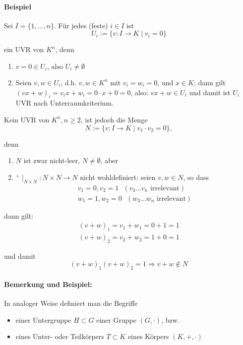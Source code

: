 \paragraph{Beispiel}
	Sei $I=\{1,...,n\}$. Für jedes (feste) $i\in I$ ist
	\begin{equation*}
		U_i := \{v:I\to K\mid v_i =0\}
	\end{equation*}

	ein UVR von $K^n$, denn
	\begin{enumerate}
		\item $v = 0 \in U_i\text{, also } U_i \neq \emptyset$
		\item Seien $v,w\in U_i$, d.h. $v,w\in K^n$ mit $v_i =w_i =0$, und $x\in K$; dann gilt $(vx+w)_i = v_ix+ w_i = 0\cdot x + 0 = 0$, also: $vx+w\in U_i$ und damit ist $U_i$ UVR nach Unterraumkriterium.  
	\end{enumerate}
	
	Kein UVR von $K^n, n\geq 2$, ist jedoch die Menge
	\begin{equation*}
		N:=\{v:I\to K\mid v_1\cdot v_2 = 0\},
	\end{equation*}
  
	denn 
	\begin{enumerate}
		\item $N$ ist zwar nicht-leer, $N\neq \emptyset$, aber
		\item $^+\mid_{N\times N}: N\times N\to N$ nicht wohldefiniert: seien $v,w\in N$, so dass
			\begin{gather*}
				v_1=0, v_2=1\text{ }(v_3 ... v_n \text{ irrelevant})\\
				w_1=1, w_2 = 0\text{ }(w_3 ... w_n \text{ irrelevant})
			\end{gather*}
	\end{enumerate}
	
	dann gilt:
	\begin{gather*}
		(v+w)_1 = v_1 + w_1 = 0+1=1\\
		(v+w)_2 = v_2 + w_2 = 1+0 = 1
	\end{gather*}

	und damit
	\begin{equation*}
		(v+w)_1(v+w)_2 = 1 \Rightarrow v+w\notin N
	\end{equation*}

\paragraph{Bemerkung und Beispiel:}
	In analoger Weise definiert man die Begriffe
	\begin{itemize}
		\item einer Untergruppe $H\subset G$ einer Gruppe $(G,\cdot)$, bzw.
		\item eines Unter- oder Teilkörpers $T\subset K$ eines Körpers $(K,+,\cdot )$
	\end{itemize}
	
